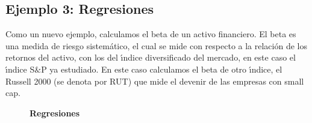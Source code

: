 \subsection{Ejemplo 3: Regresiones}
Como un nuevo ejemplo, calculamos el beta de un activo financiero. El beta es una medida de riesgo sistem\'atico, el cual se mide con respecto a la relaci\'on de los retornos del activo, con los del \'\i{}ndice diversificado del mercado, en este caso el \'\i{}ndice S$\&$P ya estudiado. En este caso calculamos el beta de otro \'\i{}ndice, el Russell 2000 (se denota por RUT) que mide el devenir de las empresas con small cap. 

\begin{figure}[H]
	\centering
	\textbf{Regresiones}\par\medskip
\end{figure}


